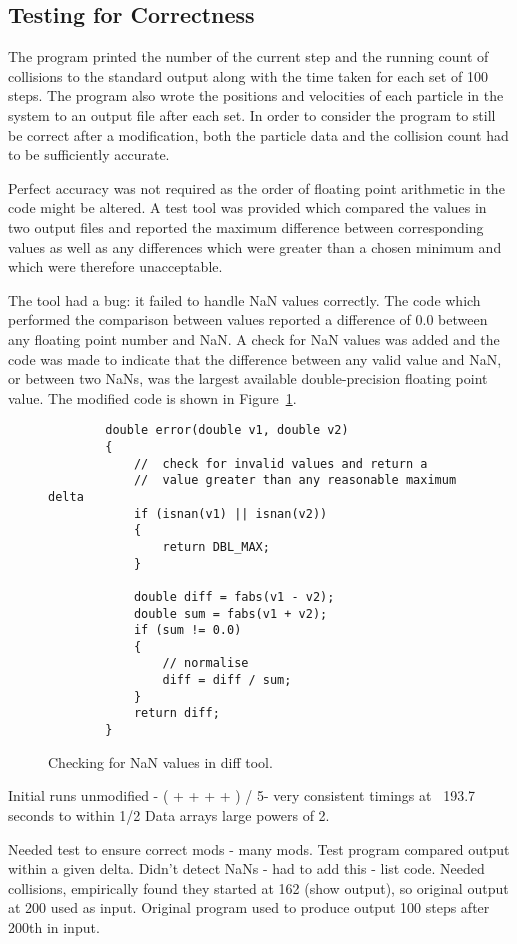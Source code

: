 \documentclass[11pt, oneside]{article}   %
\begin{document}
\subsection{Testing for Correctness}

The program printed the number of the current step and the running count of collisions to the standard output along with the time taken for each set of 100 steps.
The program also wrote the positions and velocities of each particle in the system to an output file after each set.
In order to consider the program to still be correct after a modification, both the particle data and the collision count had to be sufficiently accurate.  

Perfect accuracy was not required as the order of floating point arithmetic in the code might be altered.
A test tool was provided which compared the values in two output files and reported the maximum difference between corresponding values as well as any differences which were greater than a chosen minimum and which were therefore unacceptable.  

The tool had a bug: it failed to handle NaN values correctly.
The code which performed the comparison between values reported a difference of 0.0 between any floating point number and NaN.
A check for NaN values was added and the code was made to indicate that the difference between any valid value and NaN, or between two NaNs, was the largest available double-precision floating point value.
The modified code is shown in Figure~\ref{fig:NanTest}.

\begin{figure}
	\begin{lstlisting}
		double error(double v1, double v2)
		{
			//  check for invalid values and return a 
			//  value greater than any reasonable maximum delta
			if (isnan(v1) || isnan(v2))
			{
				return DBL_MAX;
			}

			double diff = fabs(v1 - v2);
			double sum = fabs(v1 + v2);
			if (sum != 0.0)
			{
				// normalise
				diff = diff / sum;
			}
			return diff;
		}
	\end{lstlisting}
	\caption{Checking for NaN values in diff tool.}
	\label{fig:NanTest}
\end{figure}



Initial runs unmodified - ( +  +  +  + ) / 5- very consistent timings at ~193.7 seconds to within 1/2 %
Data arrays large powers of 2.

Needed test to ensure correct mods - many mods.
Test program compared output within a given delta.
Didn't detect NaNs - had to add this - list code.
Needed collisions, empirically found they started at 162 (show output), so original output at 200 used as input.
Original program used to produce output 100 steps after 200th in input.
\end{document}
